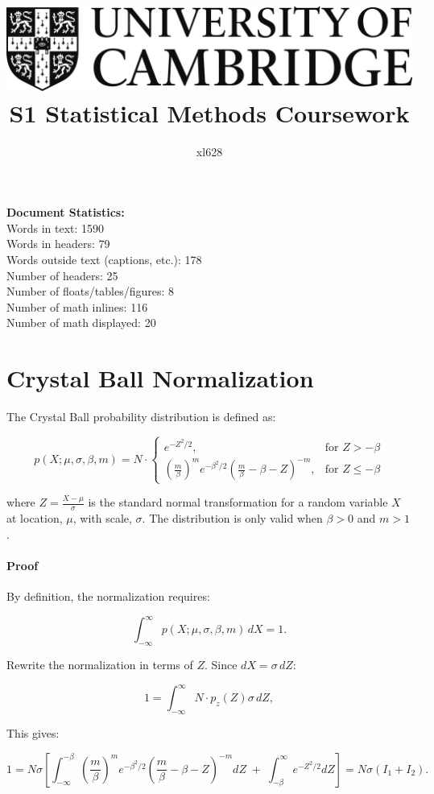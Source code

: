 \documentclass{article}
\title{
\includegraphics[scale=0.2]{Cam_logo_bw.png}\\
\vspace{0.5cm}
S1 Statistical Methods Coursework
}
\author{xl628}
\affil{Department of Physics, University of Cambridge}
\begin{document}
\maketitle

\vspace{1cm}
\noindent
\textbf{Document Statistics:} \\
Words in text: 1590 \\
Words in headers: 79 \\
Words outside text (captions, etc.): 178 \\
Number of headers: 25 \\
Number of floats/tables/figures: 8 \\
Number of math inlines: 116 \\
Number of math displayed: 20

\section{Crystal Ball Normalization}

The Crystal Ball probability distribution is defined as:

$$
p(X; \mu, \sigma, \beta, m) = N \cdot
\begin{cases}
e^{-Z^2/2}, & \text{for } Z > -\beta \\
\left(\frac{m}{\beta}\right)^m e^{-\beta^2/2} \left(\frac{m}{\beta} - \beta - Z\right)^{-m}, & \text{for } Z \leq -\beta
\end{cases}
$$

where \( Z = \frac{X - \mu}{\sigma} \) is the standard normal transformation for a random variable $X$ at location, $\mu$, with scale, $\sigma$. The distribution is only valid when \( \beta > 0 \) and \( m > 1 \).

\paragraph{Proof}

By definition, the normalization requires:

$$
\int_{-\infty}^{\infty} p(X; \mu, \sigma, \beta, m)\, dX = 1.
$$

Rewrite the normalization in terms of $Z$. Since $ dX = \sigma\, dZ $:

$$
1 = \int_{-\infty}^{\infty} N \cdot p_z(Z) \sigma\, dZ,
$$

This gives:

\begin{equation}
\label{eq:I1I2}
    1 = N \sigma \left[ \int_{-\infty}^{- \beta} \left(\frac{m}{\beta}\right)^m e^{-\beta^2/2} \left(\frac{m}{\beta} - \beta - Z\right)^{-m} dZ \;+\; \int_{-\beta}^{\infty} e^{-Z^2/2} dZ \right] = N \sigma(I_1 + I_2).
\end{equation}
\end{document}
